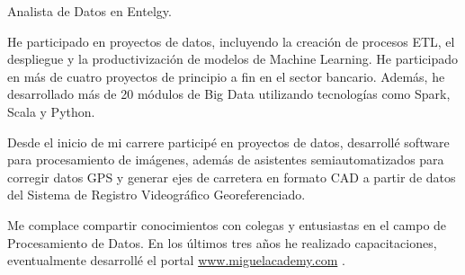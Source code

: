 

\begin{cvparagraph}


Analista de Datos en Entelgy.

He participado en proyectos de datos, incluyendo la creaci\'on de procesos ETL, el despliegue y la productivizaci\'on de modelos de Machine Learning.
He participado en m\'as de cuatro proyectos de principio a fin en el sector bancario.
Adem\'as, he desarrollado m\'as de 20 m\'odulos de Big Data utilizando tecnolog\'ias como Spark, Scala y Python.

Desde el inicio de mi carrere participé en proyectos de datos, desarrollé software para procesamiento de imágenes, además de asistentes semiautomatizados para corregir datos GPS y generar ejes de carretera en formato CAD a partir de datos del Sistema de Registro Videográfico Georeferenciado.

Me complace compartir conocimientos con colegas y entusiastas en el campo de Procesamiento de Datos.
En los \'ultimos tres años he realizado capacitaciones, eventualmente desarroll\'e el portal \href{www.miguelacademy.com}{www.miguelacademy.com} .

\end{cvparagraph}
